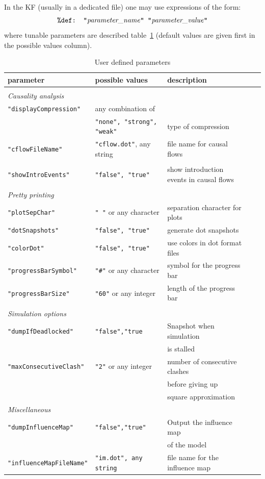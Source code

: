 \documentclass[11pt]{book}
\def\ttt#1{\texttt{#1}}
\begin{document}
In the KF (usually in a dedicated file) one may use expressions of the form:
\[
\hbox{\ttt{\%def: "}\textit{parameter\_name}\ttt{" "}\textit{parameter\_value}\ttt{"}}
\]
where tunable parameters are described table~\ref{tab:parameters} (default values are given first in the possible values column).
\begin{table}[ht]
\caption{User defined parameters}
\begin{tabular}{l|l|lll}
parameter & possible values & description \\
\hline &\\
\textit{Causality analysis}&\\
\ttt{"displayCompression"} & any combination of \\
&  \ttt{"none", "strong", "weak"} & \small type of compression \\
\ttt{"cflowFileName"} & \ttt{"cflow.dot"}, any string & \small file name for causal flows\\ & \\
\ttt{"showIntroEvents"} & \ttt{"false", "true"} & \small show introduction events in causal flows\\ & \\
\textit{Pretty printing}&\\
\ttt{"plotSepChar"} & \ttt{" "} or any character & \small separation character for plots\\
\ttt{"dotSnapshots"} & \ttt{"false", "true"} & \small generate dot snapshots\\
\ttt{"colorDot"} &  \ttt{"false", "true"} & \small use colors in dot format files\\
\ttt{"progressBarSymbol"} & \ttt{"\#"} or any character & \small symbol for the progress bar\\
\ttt{"progressBarSize"} & \ttt{"60"} or any integer & \small length of the progress bar\\ &&\\
\textit{Simulation options} &\\
\ttt{"dumpIfDeadlocked"} & \ttt{"false","true} & \small Snapshot when simulation \\&&\small is stalled\\
\ttt{"maxConsecutiveClash"} & \ttt{"2"} or any integer & \small number of consecutive clashes \\ && \small before giving up \\ && \small square approximation\\
\textit{Miscellaneous} &\\
\ttt{"dumpInfluenceMap"} & \ttt{"false","true"} & \small Output the influence map \\ &&\small of the model\\
\ttt{"influenceMapFileName"} & \ttt{"im.dot", any string} & \small file name for the influence map\\

\end{tabular}
\label{tab:parameters}
\end{table}
\end{document}

